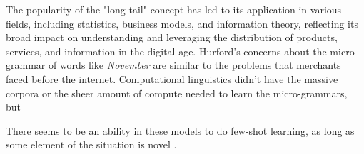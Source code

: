 The popularity of the "long tail" concept has led to its application in various fields, including statistics, business models, and information theory, reflecting its broad impact on understanding and leveraging the distribution of products, services, and information in the digital age. Hurford's concerns about the micro-grammar of words like \textit{November} are similar to the problems that merchants faced before the internet. Computational linguistics didn't have the massive corpora or the sheer amount of compute needed to learn the micro-grammars, but 



There seems to be an ability in these models to do few-shot learning, as long as some element of the situation is novel \citep{Liu2019}.



